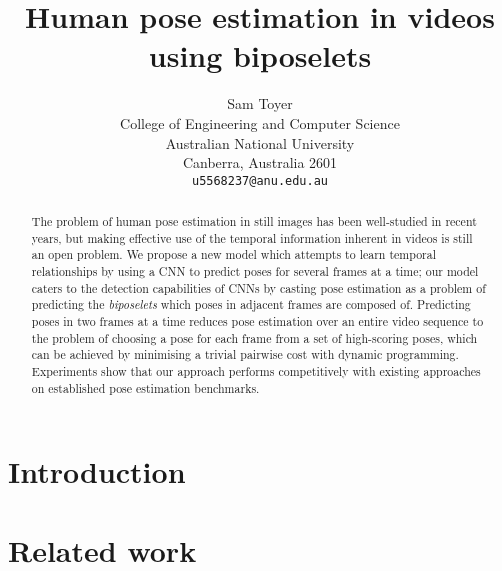 \documentclass{article}
\title{Human pose estimation in videos using biposelets}
\author{
  Sam Toyer\\
  College of Engineering and Computer Science\\
  Australian National University\\
  Canberra, Australia 2601\\
  \texttt{u5568237@anu.edu.au}\\
}
\begin{document}
\maketitle

\begin{abstract}
The problem of human pose estimation in still images has been well-studied in
recent years, but making effective use of the temporal information inherent in
videos is still an open problem. We propose a new model which attempts to learn
temporal relationships by using a CNN to predict poses for several frames at a
time; our model caters to the detection capabilities of CNNs by casting pose
estimation as a problem of predicting the \textit{biposelets} which poses in
adjacent frames are composed of. Predicting poses in two frames at a time
reduces pose estimation over an entire video sequence to the problem of choosing
a pose for each frame from a set of high-scoring poses, which can be achieved by
minimising a trivial pairwise cost with dynamic programming. Experiments show
that our approach performs competitively with existing approaches on established
pose estimation benchmarks.
\end{abstract}

\section{Introduction}


\section{Related work}

\end{document}
